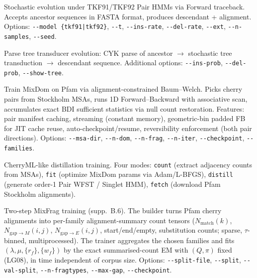 \begin{description}[style=nextline,leftmargin=2em]
\item[\texttt{evolve.py}]
  Stochastic evolution under TKF91/TKF92 Pair HMMs via Forward traceback.
  Accepts ancestor sequences in FASTA format, produces descendant + alignment.
  Options: \texttt{-{}-model \{tkf91|tkf92\}}, \texttt{-{}-t}, \texttt{-{}-ins-rate},
  \texttt{-{}-del-rate}, \texttt{-{}-ext}, \texttt{-{}-n-samples}, \texttt{-{}-seed}.

\item[\texttt{evolve\_tree.py}]
  Parse tree transducer evolution: CYK parse of ancestor $\to$ stochastic tree
  transduction $\to$ descendant sequence.
  Additional options: \texttt{-{}-ins-prob}, \texttt{-{}-del-prob}, \texttt{-{}-show-tree}.

\item[\texttt{train\_pfam.py}]
  Train MixDom on Pfam via alignment-constrained Baum--Welch.
  Picks cherry pairs from Stockholm MSAs, runs 1D Forward--Backward
  with associative scan, accumulates exact BDI sufficient statistics
  via null count restoration.
  Features: pair manifest caching, streaming (constant memory),
  geometric-bin padded FB for JIT cache reuse, auto-checkpoint/resume,
  reversibility enforcement (both pair directions).
  Options: \texttt{-{}-msa-dir}, \texttt{-{}-n-dom}, \texttt{-{}-n-frag},
  \texttt{-{}-n-iter}, \texttt{-{}-checkpoint}, \texttt{-{}-families}.

\item[\texttt{maraschino.py}]
  CherryML-like distillation training. Four modes:
  \texttt{count} (extract adjacency counts from MSAs),
  \texttt{fit} (optimize MixDom params via Adam/L-BFGS),
  \texttt{distill} (generate order-1 Pair WFST / Singlet HMM),
  \texttt{fetch} (download Pfam Stockholm alignments).

\item[\texttt{build\_mixfrag\_cherry\_counts.py} / \texttt{train\_mixfrag\_cherry\_em.py}]
  Two-step MixFrag training (supp.~B.6). The builder turns Pfam cherry
  alignments into per-family alignment-summary count tensors
  ($N_{\mathrm{match}}(k)$, $N_{\mathrm{gap}\to M}(i,j)$, $N_{\mathrm{gap}\to E}(i,j)$,
  start/end/empty, substitution counts; sparse, $\tau$-binned, multiprocessed).
  The trainer aggregates the chosen families and fits $(\lambda,\mu,\{r_f\},\{w_f\})$
  by the exact summarised-count EM with $(Q,\pi)$ fixed (LG08), in time
  independent of corpus size.
  Options: \texttt{-{}-split-file}, \texttt{-{}-split}, \texttt{-{}-val-split},
  \texttt{-{}-n-fragtypes}, \texttt{-{}-max-gap}, \texttt{-{}-checkpoint}.
\end{description}

